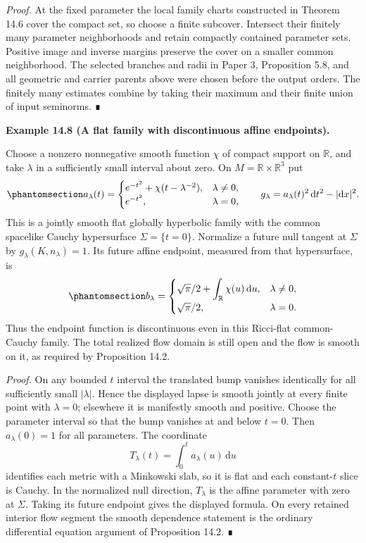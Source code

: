 \documentclass[
  english,
  11pt,
  reqno]{amsart}
\makeatletter
\newcommand{\pandocstatementheading}[1]{%
  \par\if@nobreak\else
    \addpenalty{\@beginparpenalty}%
    \addvspace{.5\baselineskip plus .2\baselineskip minus .2\baselineskip}%
  \fi
  {\normalfont\bfseries #1\par}%
  \nobreak\@afterindenttrue\@afterheading
}
\makeatother
\begin{document}
\emph{Proof.} At the fixed parameter the local family charts constructed
in Theorem 14.6 cover the compact set, so choose a finite subcover.
Intersect their finitely many parameter neighborhoods and retain
compactly contained parameter sets. Positive image and inverse margins
preserve the cover on a smaller common neighborhood. The selected
branches and radii in Paper 3, Proposition 5.8, and all geometric and
carrier parents above were chosen before the output orders. The finitely
many estimates combine by taking their maximum and their finite union of
input seminorms. ∎

\pandocstatementheading{\protect{}\label{ex:family-affine-endpoint-jump}Example 14.8 (A flat family with discontinuous affine endpoints).}

Choose a nonzero nonnegative smooth function \(\chi\) of compact support
on \(\mathbb R\), and take \(\lambda\) in a sufficiently small interval
about zero. On \(M=\mathbb R\times\mathbb R^3\) put
\begin{equation}\protect\phantomsection\label{eq:family-escaping-lapse-bump}{
a_\lambda(t)=
\begin{cases}
 e^{-t^2}+\chi(t-\lambda^{-2}),&\lambda\ne0,\\
 e^{-t^2},&\lambda=0,
\end{cases}
\qquad
g_\lambda=a_\lambda(t)^2\,\mathrm dt^2-|\mathrm dx|^2.
}\end{equation} This is a jointly smooth flat globally hyperbolic family
with the common spacelike Cauchy hypersurface \(\Sigma=\{t=0\}\).
Normalize a future null tangent at \(\Sigma\) by
\(g_\lambda(K,n_\lambda)=1\). Its future affine endpoint, measured from
that hypersurface, is
\begin{equation}\protect\phantomsection\label{eq:family-discontinuous-affine-endpoint}{
b_\lambda=
\begin{cases}
 \sqrt\pi/2+\displaystyle\int_{\mathbb R}\chi(u)\,\mathrm du,
   &\lambda\ne0,\\
 \sqrt\pi/2,&\lambda=0.
\end{cases}
}\end{equation} Thus the endpoint function is discontinuous even in this
Ricci-flat common-Cauchy family. The total realized flow domain is still
open and the flow is smooth on it, as required by Proposition 14.2.

\emph{Proof.} On any bounded \(t\) interval the translated bump vanishes
identically for all sufficiently small \(|\lambda|\). Hence the
displayed lapse is smooth jointly at every finite point with
\(\lambda=0\); elsewhere it is manifestly smooth and positive. Choose
the parameter interval so that the bump vanishes at and below \(t=0\).
Then \(a_\lambda(0)=1\) for all parameters. The coordinate \[
T_\lambda(t)=\int_0^t a_\lambda(u)\,\mathrm du
\] identifies each metric with a Minkowski slab, so it is flat and each
constant-\(t\) slice is Cauchy. In the normalized null direction,
\(T_\lambda\) is the affine parameter with zero at \(\Sigma\). Taking
its future endpoint gives the displayed formula. On every retained
interior flow segment the smooth dependence statement is the ordinary
differential equation argument of Proposition 14.2. ∎
\end{document}
